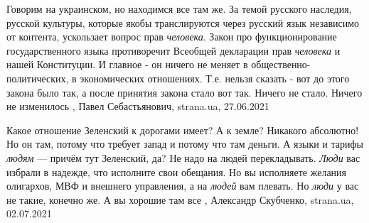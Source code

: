 Говорим на украинском, но находимся все там же.  За темой русского наследия,
русской культуры, которые якобы транслируются через русский язык независимо от
контента, ускользает вопрос прав \emph{человека}.  Закон про функционирование
государственного языка противоречит Всеобщей декларации прав \emph{человека} и нашей
Конституции. И главное - он ничего не меняет в общественно-политических, в
экономических отношениях. Т.е. нельзя сказать - вот до этого закона было так, а
после принятия закона стало вот так. Ничего не стало. Ничего не изменилось
, 
Павел Себастьянович, strana.ua, 27.06.2021

Какое отношение Зеленский к дорогами имеет? А к земле? Никакого абсолютно! Но
он там, потому что требует запад и потому что там деньги. А языки и тарифы
\emph{людям} — причём тут Зеленский, да?  Не надо на людей перекладывать.
\emph{Люди} вас избрали в надежде, что исполните свои обещания. Но вы
исполняете желания олигархов, МВФ и внешнего управления, а на \emph{людей} вам
плевать. Но \emph{люди} у вас не такие, конечно же. А вы хорошие там все
, 
Александр Скубченко, strana.ua, 02.07.2021

